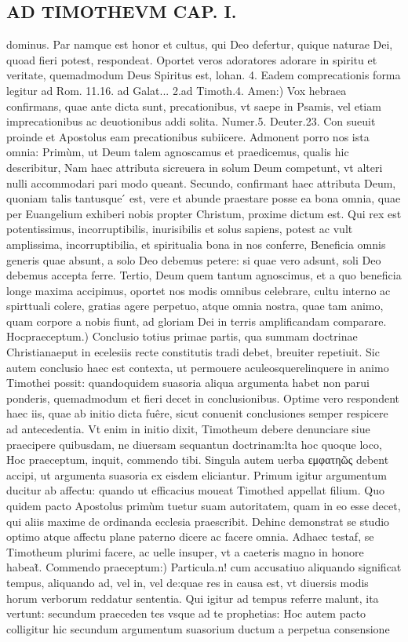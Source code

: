 \documentclass{article}
\begin{document}
\begin{pages}
\section*{AD TIMOTHEVM CAP. I. }
\marginpar{[ p.59 ]}\pstart dominus. Par namque  est honor et cultus, qui Deo defertur, quique  naturae Dei, quoad fieri potest, respondeat. Oportet veros adoratores adorare in spiritu et veritate, quemadmodum Deus Spiritus est, lohan. 4. Eadem comprecationis forma legitur ad Rom. 11.16. ad Galat... 2.ad Timoth.4.  \pend\pstart Amen:) Vox hebraea confirmans, quae ante dicta sunt, precationibus, vt saepe in Psamis, vel etiam imprecationibus ac deuotionibus addi solita. Numer.5. Deuter.23. Con sueuit proinde et Apostolus eam precationibus subiicere. Admonent porro nos ista omnia: Primùm, ut Deum talem agnoscamus et praedicemus, qualis hic describitur, Nam haec attributa sicreuera in solum Deum competunt, vt alteri nulli accommodari pari modo queant. Secundo, confirmant haec attributa Deum, quoniam talis tantusque ́ est, vere et abunde praestare posse ea bona omnia, quae per Euangelium exhiberi nobis propter Christum, proxime dictum est. Qui rex est potentissimus, incorruptibilis, inurisibilis et solus sapiens, potest ac vult amplissima, incorruptibilia, et spiritualia bona in nos conferre, Beneficia omnis generis quae absunt, a solo Deo debemus petere: si quae vero adsunt, soli Deo debemus accepta ferre. Tertio, Deum quem tantum agnoscimus, et a quo beneficia longe maxima accipimus, oportet nos modis omnibus celebrare, cultu interno ac spirttuali colere, gratias agere perpetuo, atque  omnia nostra, quae tam animo, quam corpore a nobis fiunt, ad gloriam Dei in terris amplificandam comparare.  \pend\pstart Hocpraeceptum.) Conclusio totius primae partis, qua summam doctrinae Christianaeput in ecelesiis recte constitutis tradi debet, breuiter repetiuit. Sic autem conclusio haec est contexta, ut permouere aculeosquerelinquere in animo Timothei possit: quandoquidem suasoria aliqua argumenta habet non parui ponderis, quemadmodum et fieri decet in conclusionibus. Optime vero respondent haec iis, quae ab initio dicta fuêre, sicut conuenit conclusiones semper respicere ad antecedentia. Vt enim in initio dixit, Timotheum debere denunciare siue praecipere quibusdam, ne diuersam sequantun doctrinam:lta hoc quoque  loco, Hoc praeceptum, inquit, commendo tibi. Singula autem uerba εμφατηῶς debent accipi, ut argumenta suasoria ex eisdem eliciantur. Primum igitur argumentum ducitur ab affectu: quando ut efficacius moueat Timothed appellat filium. Quo quidem pacto Apostolus primùm tuetur suam autoritatem, quam in eo esse decet, qui aliis maxime de ordinanda ecclesia praescribit. Dehinc demonstrat se studio optimo atque  affectu plane paterno dicere ac facere omnia. Adhaec testaf, se Timotheum plurimi facere, ac uelle insuper, vt a caeteris magno in honore habeat̃.  \pend\pstart Commendo praeceptum:) Particula.n! cum accusatiuo aliquando significat tempus, aliquando ad, vel in, vel de:quae res in causa est, vt diuersis modis horum verborum reddatur sententia. Qui igitur ad tempus referre malunt, ita vertunt: secundum praeceden tes vsque  ad te prophetias: Hoc autem pacto colligitur hic secundum argumentum suasorium ductum a perpetua consensione 
\end{pages}
\end{document}
